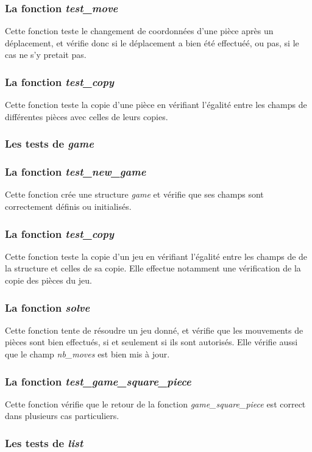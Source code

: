 \documentclass{report}
\begin{document}
\subsubsection*{La fonction \textit{test\_move}}
Cette fonction teste le changement de coordonnées d'une pièce après un déplacement, et vérifie donc si le déplacement a bien été effectuéé, ou pas, si le cas ne s'y pretait pas.
\subsubsection*{La fonction \textit{test\_copy}}
Cette fonction teste la copie d'une pièce en vérifiant l'égalité entre les champs de différentes pièces avec celles de leurs copies.
\subsubsection{Les tests de \textit{game}}
\subsubsection*{La fonction \textit{test\_new\_game}}
Cette fonction crée une structure \textit{game} et vérifie que ses champs sont correctement définis ou initialisés.
\subsubsection*{La fonction \textit{test\_copy}}
Cette fonction teste la copie d'un jeu en vérifiant l'égalité entre les champs de de la structure et celles de sa copie. Elle effectue notamment une vérification de la copie des pièces du jeu.
\subsubsection*{La fonction \textit{solve}}
Cette fonction tente de résoudre un jeu donné, et vérifie que les mouvements de pièces sont bien effectués, si et seulement si ils sont autorisés. Elle vérifie aussi que le champ \textit{nb\_moves} est bien mis à jour.
\subsubsection*{La fonction \textit{test\_game\_square\_piece}}
Cette fonction vérifie que le retour de la fonction \textit{game\_square\_piece} est correct dans plusieurs cas particuliers.
\subsubsection{Les tests de \textit{list}}
\end{document}
